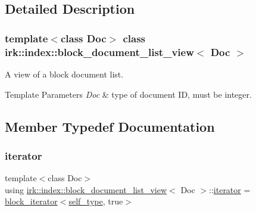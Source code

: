\subsection{Detailed Description}
\subsubsection*{template$<$class Doc$>$\newline
class irk\+::index\+::block\+\_\+document\+\_\+list\+\_\+view$<$ Doc $>$}

A view of a block document list. 


\begin{DoxyTemplParams}{Template Parameters}
{\em Doc} & type of document ID, must be integer. \\
\hline
\end{DoxyTemplParams}


\subsection{Member Typedef Documentation}
\mbox{\label{classirk_1_1index_1_1block__document__list__view_ac9190c4c0eb1b9cc20a1b6a5fbea1d80}} 
\subsubsection{\texorpdfstring{iterator}{iterator}}
{\footnotesize\ttfamily template$<$class Doc$>$ \\
using \mbox{\hyperlink{classirk_1_1index_1_1block__document__list__view}{irk\+::index\+::block\+\_\+document\+\_\+list\+\_\+view}}$<$ Doc $>$\+::\mbox{\hyperlink{classirk_1_1index_1_1block__document__list__view_ac9190c4c0eb1b9cc20a1b6a5fbea1d80}{iterator}} =  \mbox{\hyperlink{classirk_1_1index_1_1block__iterator}{block\+\_\+iterator}}$<$\mbox{\hyperlink{classirk_1_1index_1_1block__document__list__view_a006662b07e3f2cd8f0c9709584e4f7f3}{self\+\_\+type}}, true$>$}

\mbox{\label{classirk_1_1index_1_1block__document__list__view_a006662b07e3f2cd8f0c9709584e4f7f3}} 
